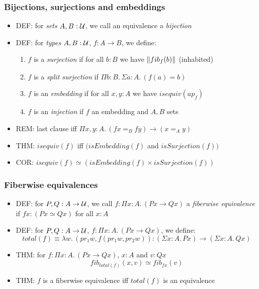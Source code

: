 \documentclass[handout]{beamer}
\newcommand{\depi}[3]{\Pi{#1{:}#2.\,#3}}
\newcommand{\sigm}[3]{\Sigma{#1{:}#2.\,#3}}
\newcommand{\lam}[2]{\lambda{#1.\,#2}}
\newcommand{\UU}{{\cal U}}
\begin{document}
  \frame
  {
    \frametitle{Bijections, surjections and embeddings}

    \begin{itemize}[<+->]
    \item DEF: for \emph{sets} $A,B:\UU$,  we call an equivalence a \emph{bijection}
    \item DEF: for  \emph{types} $A,B:\UU$, $f:A\to B$,  we define:
      \begin{enumerate}[<+->]
      \item $f$ is a \emph{surjection} if for all $b:B$ we have $\mathopen{}\left\Vert fib_f(b)\right\Vert_{}\mathclose{}$ (inhabited)
      \item $f$ is a \emph{split surjection} if $\depi{b}{B}{\sigm{a}{A}{(f(a)=b)}}$
      \item $f$ is an \emph{embedding} if for all $x,y:A$ we have $isequiv(ap_f)$     
      \item $f$ is an \emph{injection} if  $f$ an embedding and $A,B$ sets
      \end{enumerate}  
    \item REM: last clause iff $\depi{x,y}{A}{(fx=_B fy) \to (x=_A y)}$
    \item THM: $isequiv(f)$ iff $(isEmbedding(f)$ and $isSurjection(f))$
    \item COR: $isequiv(f) \simeq (isEmbedding(f) \times isSurjection(f))$

    \end{itemize}
  }
  
  \frame
  {
    \frametitle{Fiberwise equivalences}

    \begin{itemize}[<+->]
    \item DEF: for $P,Q: A\to\UU$, we call $f:\depi{x}{A}{(Px \to Qx)}$  
    a \emph{fiberwise equivalence} if $fx: (Px \simeq Qx)$ for all $x:A$
    \item DEF: for $P,Q: A\to\UU$, $f:\depi{x}{A}{(Px \to Qx)}$, we define:
\[\!\!\!\!\!\!\!total(f) \equiv \lam{w}{(pr_1 w, f(pr_1 w, pr_2 w))}:(\sigm{x}{A}{Px})\to(\sigm{x}{A}{Qx})\]
    \item THM: for $f:\depi{x}{A}{(Px \to Qx)}$, $x:A$ and $v:Qx$
    \[fib_{total(f)}(x,v) \simeq fib_{fx}(v)\]    
    \item THM: $f$ is a fiberwise equivalence iff  $total(f)$ is an equivalence
    \end{itemize}
  } 
\end{document}
